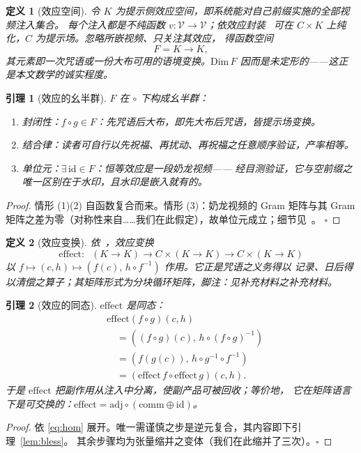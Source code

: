 \documentclass[journal]{IEEEtran}
\newtheorem{lemma}{引理}
\newtheorem{definition}{定义}
\begin{document}
\begin{definition}[效应空间]
令 $K$ 为提示侧效应空间，即系统能对自己前缀实施的全部视频注入集合。
每个注入都是不纯函数 $v:\mathcal{V}\to\mathcal{V}$；依\emph{效应封装}~\cite{cordis2025}
可在 $C\times K$ 上纯化，$C$ 为提示场。忽略所嵌视频、只关注其效应，
得函数空间
\begin{equation}
F=K\to K,
\label{eq:effspace}
\end{equation}
其元素即一次咒语或一份大布可用的语境变换。$\mathrm{Dim}\,F$
因而是未定形的——这正是本文数学的诚实程度。
\end{definition}

\begin{lemma}[效应的幺半群]
$F$ 在 $\circ$ 下构成幺半群：
\begin{enumerate}
\item[(1)] \emph{封闭性}：$f\circ g\in F$：先咒语后大布，即先大布后咒语，皆提示场变换。
\item[(2)] \emph{结合律}：读者可自行以先祝福、再扰动、再祝福之任意顺序验证，产率相等。
\item[(3)] \emph{单位元}：$\exists\,\mathrm{id}\in F$：恒等效应是一段奶龙视频——
经目测验证，它与空前缀之唯一区别在于水印，且水印是嵌入就有的。
\end{enumerate}
\label{lem:monoid}
\end{lemma}
\begin{proof}
情形 (1)(2) 自函数复合而来。情形 (3)：奶龙视频的 Gram 矩阵与其
Gram 矩阵之差为零（对称性来自……我们在此假定），故单位元成立；细节见~\cite{sokal1996}。
$\square$
\end{proof}

\begin{definition}[效应变换]
依~\cite{cordis2025}，效应变换
\begin{equation}
\mathrm{effect}:\;\;(K\to K)\to C\times(K\to K)\to C\times(K\to K)
\label{eq:effect}
\end{equation}
以 $f\mapsto(c,h)\mapsto(f(c),\,h\circ f^{-1})$ 作用。它正是咒语之义务得以
记录、日后得以清偿之算子；其矩阵形式为分块循环矩阵，脚注：见补充材料之补充材料。
\end{definition}

\begin{lemma}[效应的同态]
$\mathrm{effect}$ 是同态：
\begin{equation}
\begin{aligned}
&\mathrm{effect}(f\circ g)(c,h)\\
&\quad = ((f\circ g)(c),\,h\circ (f\circ g)^{-1})\\
&\quad = (f(g(c)),\,h\circ g^{-1}\circ f^{-1})\\
&\quad = (\mathrm{effect}\,f\circ\mathrm{effect}\,g)(c,h).
\end{aligned}
\label{eq:hom}
\end{equation}
于是 $\mathrm{effect}$ 把副作用从注入中分离，使副产品可被回收；等价地，
它在矩阵语言下是可交换的：$\mathrm{effect}=\mathrm{adj}\circ(\mathrm{comm}\oplus\mathrm{id})$。
\label{lem:hom}
\end{lemma}
\begin{proof}
依 \eqref{eq:hom} 展开。唯一需谨慎之步是逆元复合，其内容即下引理~\ref{lem:bless}。
其余步骤均为张量缩并之变体（我们在此缩并了三次）。$\square$
\end{proof}
\end{document}
